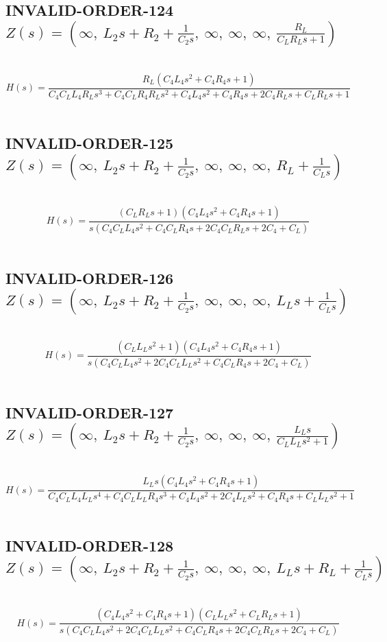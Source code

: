 \documentclass{article}
\begin{document}
\subsection{INVALID-ORDER-124 $Z(s) = \left( \infty, \  L_{2} s + R_{2} + \frac{1}{C_{2} s}, \  \infty, \  \infty, \  \infty, \  \frac{R_{L}}{C_{L} R_{L} s + 1}\right)$ } \ 
\textbf{\[H(s) = \frac{R_{L} \left(C_{4} L_{4} s^{2} + C_{4} R_{4} s + 1\right)}{C_{4} C_{L} L_{4} R_{L} s^{3} + C_{4} C_{L} R_{4} R_{L} s^{2} + C_{4} L_{4} s^{2} + C_{4} R_{4} s + 2 C_{4} R_{L} s + C_{L} R_{L} s + 1}\] } \ 
\subsection{INVALID-ORDER-125 $Z(s) = \left( \infty, \  L_{2} s + R_{2} + \frac{1}{C_{2} s}, \  \infty, \  \infty, \  \infty, \  R_{L} + \frac{1}{C_{L} s}\right)$ } \ 
\textbf{\[H(s) = \frac{\left(C_{L} R_{L} s + 1\right) \left(C_{4} L_{4} s^{2} + C_{4} R_{4} s + 1\right)}{s \left(C_{4} C_{L} L_{4} s^{2} + C_{4} C_{L} R_{4} s + 2 C_{4} C_{L} R_{L} s + 2 C_{4} + C_{L}\right)}\] } \ 
\subsection{INVALID-ORDER-126 $Z(s) = \left( \infty, \  L_{2} s + R_{2} + \frac{1}{C_{2} s}, \  \infty, \  \infty, \  \infty, \  L_{L} s + \frac{1}{C_{L} s}\right)$ } \ 
\textbf{\[H(s) = \frac{\left(C_{L} L_{L} s^{2} + 1\right) \left(C_{4} L_{4} s^{2} + C_{4} R_{4} s + 1\right)}{s \left(C_{4} C_{L} L_{4} s^{2} + 2 C_{4} C_{L} L_{L} s^{2} + C_{4} C_{L} R_{4} s + 2 C_{4} + C_{L}\right)}\] } \ 
\subsection{INVALID-ORDER-127 $Z(s) = \left( \infty, \  L_{2} s + R_{2} + \frac{1}{C_{2} s}, \  \infty, \  \infty, \  \infty, \  \frac{L_{L} s}{C_{L} L_{L} s^{2} + 1}\right)$ } \ 
\textbf{\[H(s) = \frac{L_{L} s \left(C_{4} L_{4} s^{2} + C_{4} R_{4} s + 1\right)}{C_{4} C_{L} L_{4} L_{L} s^{4} + C_{4} C_{L} L_{L} R_{4} s^{3} + C_{4} L_{4} s^{2} + 2 C_{4} L_{L} s^{2} + C_{4} R_{4} s + C_{L} L_{L} s^{2} + 1}\] } \ 
\subsection{INVALID-ORDER-128 $Z(s) = \left( \infty, \  L_{2} s + R_{2} + \frac{1}{C_{2} s}, \  \infty, \  \infty, \  \infty, \  L_{L} s + R_{L} + \frac{1}{C_{L} s}\right)$ } \ 
\textbf{\[H(s) = \frac{\left(C_{4} L_{4} s^{2} + C_{4} R_{4} s + 1\right) \left(C_{L} L_{L} s^{2} + C_{L} R_{L} s + 1\right)}{s \left(C_{4} C_{L} L_{4} s^{2} + 2 C_{4} C_{L} L_{L} s^{2} + C_{4} C_{L} R_{4} s + 2 C_{4} C_{L} R_{L} s + 2 C_{4} + C_{L}\right)}\] } \ 
\end{document}
